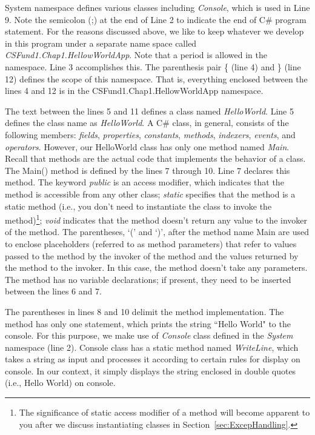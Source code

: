 System namespace defines various classes including \emph{Console},
which is used in Line 9. Note the semicolon (;) at the end of Line
2 to indicate the end of C\# program statement. For the reasons
discussed above, we like to keep whatever we develop in this
program under a separate name space called
\emph{CSFund1.Chap1.HellowWorldApp}. Note that a period is allowed
in the namespace. Line 3 accomplishes this. The parenthesis pair
\{ (line 4) and \} (line 12) defines the scope of this namespace.
That is, everything enclosed between the lines 4 and 12 is in the
CSFund1.Chap1.HellowWorldApp namespace.

The text between the lines 5 and 11 defines a class named
\emph{HelloWorld}. Line 5 defines the class name as
\emph{HelloWorld}. A C\# class, in general, consists of the
following members: \emph{fields}, \emph{properties},
\emph{constants}, \emph{methods}, \emph{indexers}, \emph{events},
and \emph{operators}. However, our HelloWorld class has only one
method named \emph{Main}. Recall that methods are the actual code
that implements the behavior of a class. The Main() method is
defined by the lines 7 through 10. Line 7 declares this method.
The keyword \emph{public} is an access modifier, which indicates
that the method is accessible from any other class; \emph{static}
specifies that the method is a static method (i.e., you don't need
to instantiate the class to invoke the method)\footnote{The
significance of static access modifier of a method will become
apparent to you after we discuss instantiating classes in
Section~\ref{sec:ExcepHandling}.}; \emph{void} indicates that the
method doesn't return any value to the invoker of the method. The
parentheses, `(' and `)', after the method name Main are used to
enclose placeholders (referred to as method parameters) that refer
to values passed to the method by the invoker of the method and
the values returned by the method to the invoker. In this case,
the method doesn't take any parameters. The method has no variable
declarations; if present, they need to be inserted between the
lines 6 and 7.

The parentheses in lines 8 and 10 delimit the method
implementation. The method has only one statement, which prints
the string ``Hello World" to the console. For this purpose, we
make use of \emph{Console} class defined in the \emph{System}
namespace (line 2). Console class has a static method named
\emph{WriteLine}, which takes a string as input and processes it
according to certain rules for display on console. In our context,
it simply displays the string enclosed in double quotes (i.e.,
Hello World) on console.


